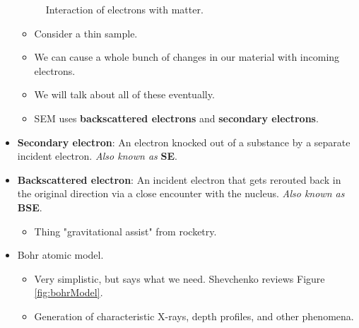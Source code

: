 \documentclass[../notes.tex]{subfiles}
\begin{document}
\begin{itemize}
\begin{figure}[h!]
        \caption{Interaction of electrons with matter.}
        \label{fig:ElectronsMatter}
    \end{figure}
    \begin{itemize}
        \item Consider a thin sample.
        \item We can cause a whole bunch of changes in our material with incoming electrons.
        \item We will talk about all of these eventually.
        \item SEM uses \textbf{backscattered electrons} and \textbf{secondary electrons}.
    \end{itemize}
    \item \textbf{Secondary electron}: An electron knocked out of a substance by a separate incident electron. \emph{Also known as} \textbf{SE}.
    \item \textbf{Backscattered electron}: An incident electron that gets rerouted back in the original direction via a close encounter with the nucleus. \emph{Also known as} \textbf{BSE}.
    \begin{itemize}
        \item Thing "gravitational assist" from rocketry.
    \end{itemize}
    \item Bohr atomic model.
    \begin{itemize}
        \item Very simplistic, but says what we need. Shevchenko reviews Figure \ref{fig:bohrModel}.
        \item Generation of characteristic X-rays, depth profiles, and other phenomena.

\end{itemize}
\end{itemize}
\end{document}
